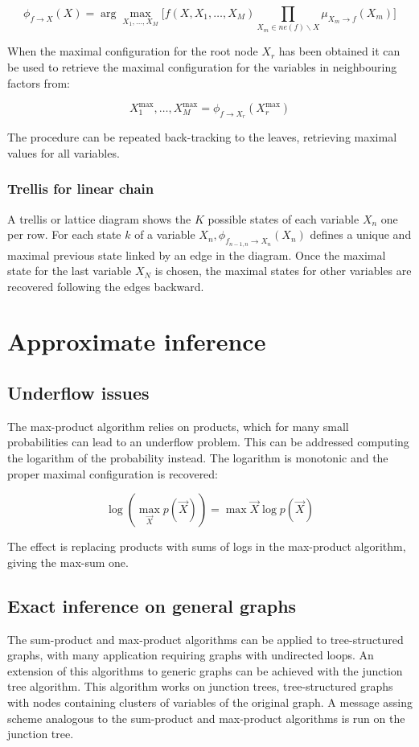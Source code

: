 		$$\phi_{f\rightarrow X}(X) = \arg\max\limits_{X_1,\dots,X_M}\biggl[f(X, X_1, \dots, X_M)\prod\limits_{X_m\in ne(f)\backslash X} \mu_{X_m\rightarrow f}(X_m)\biggr]$$

		When the maximal configuration for the root node $X_r$ has been obtained it can be used to retrieve the maximal configuration for the variables in neighbouring factors from:

		$$X_1^{\max}, \dots, X_M^{\max} = \phi_{f\rightarrow X_r}(X_r^{\max})$$

		The procedure can be repeated back-tracking to the leaves, retrieving maximal values for all variables.

		\subsubsection{Trellis for linear chain}
		A trellis or lattice diagram shows the $K$ possible states of each variable $X_n$ one per row.
		For each state $k$ of a variable $X_n, \phi_{f_{n-1,n}\rightarrow X_n}(X_n)$ defines a unique and maximal previous state linked by an edge in the diagram.
		Once the maximal state for the last variable $X_N$ is chosen, the maximal states for other variables are recovered following the edges backward.

\section{Approximate inference}

	\subsection{Underflow issues}
	The max-product algorithm relies on products, which for many small probabilities can lead to an underflow problem.
	This can be addressed computing the logarithm of the probability instead.
	The logarithm is monotonic and the proper maximal configuration is recovered:

	$$\log(\max\limits_{\vec{X}}p(\vec{X})) = \max\limits{\vec{X}}\log p(\vec{X})$$

	The effect is replacing products with sums of logs in the max-product algorithm, giving the max-sum one.

	\subsection{Exact inference on general graphs}
	The sum-product and max-product algorithms can be applied to tree-structured graphs, with many application requiring graphs with undirected loops.
	An extension of this algorithms to generic graphs can be achieved with the junction tree algorithm.
	This algorithm works on junction trees, tree-structured graphs with nodes containing clusters of variables of the original graph.
	A message assing scheme analogous to the sum-product and max-product algorithms is run on the junction tree.

